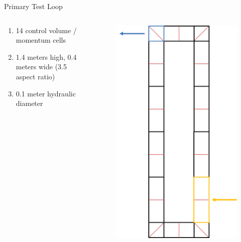 \documentclass[10pt,t,xcolor=table,compress]{UWMadBeamer}
\begin{document}
    \begin{frame}{Primary Test Loop}
        \begin{columns}
            \begin{column}[T]{0.45\textwidth}
                \begin{enumerate}
                    \item 14 control volume / momentum cells
                    \item 1.4 meters high, 0.4 meters wide (3.5 aspect ratio)
                    \item 0.1 meter hydraulic diameter
                \end{enumerate}
            \end{column}
            \hfill
            \begin{column}[T]{0.45\textwidth}
                \begin{figure}%
                    \centering
                    \includegraphics[scale=0.4]{TestLoop}%
                \end{figure}
            \end{column}
        \end{columns}
    \end{frame}
    
\end{document}
